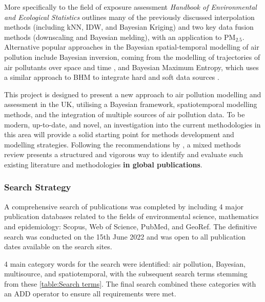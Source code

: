 More specifically to the field of exposure assessment \textit{Handbook of Environmental and Ecological Statistics} \citep{Gelfand2019HandbookStatistics} outlines many of the previously discussed interpolation methods (including kNN, IDW, and Bayesian Kriging) and two key data fusion methods (downscaling and Bayesian melding), with an application to PM$_{2.5}$. Alternative popular approaches in the Bayesian spatial-temporal modelling of air pollution include Bayesian inversion, coming from the modelling of trajectories of air pollutants over space and time \citep{Bergamaschi2000InverseRatios}, and Bayesian Maximum Entropy, which uses a similar approach to BHM to integrate hard and soft data sources \citep{He2018BayesianReview}.

This project is designed to present a new approach to air pollution modelling and assessment in the UK, utilising a Bayesian framework, spatiotemporal modelling methods, and the integration of multiple sources of air pollution data. To be modern, up-to-date, and novel, an investigation into the current methodologies in this area will provide a solid starting point for methods development and modelling strategies. Following the recommendations by \cite{Grant2009AMethodologies}, a mixed methods review presents a structured and vigorous way to identify and evaluate such existing literature and methodologies \textbf{in global publications}.

\subsubsection{Search Strategy}
A comprehensive search of publications was completed by including 4 major publication databases related to the fields of environmental science, mathematics and epidemiology: Scopus, Web of Science, PubMed, and GeoRef. The definitive search was conducted on the 15th June 2022 and was open to all publication dates available on the search sites. 

4 main category words for the search were identified: air pollution, Bayesian, multisource, and spatiotemporal, with the subsequent search terms stemming from these \ref{table:Search terms}. The final search combined these categories with an ADD operator to ensure all requirements were met.


